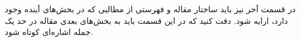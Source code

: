 \documentclass{CCI2020}
\begin{document}
در قسمت آخر نیز باید ساختار مقاله و فهرستی از مطالبی که در بخش‌های آینده وجود دارد، ارایه شود. دقت کنید که در این قسمت باید به بخش‌های بعدی مقاله در حد یک جمله اشاره‌ای کوتاه شود.
\end{document}
